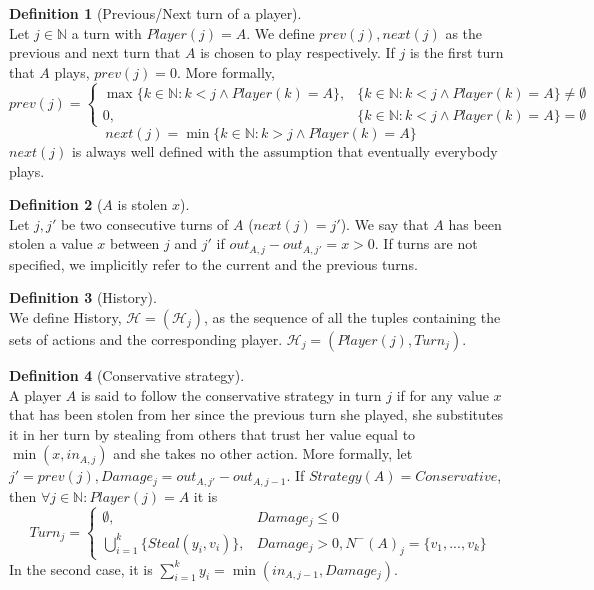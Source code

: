 \documentclass[11pt]{article}
\theoremstyle{definition}
\newtheorem{definition}{Definition}[section]
\theoremstyle{corollary}
\theoremstyle{lemma}
\begin{document}
     \begin{definition}[Previous/Next turn of a player] \ \\
        Let $j \in \mathbb{N}$ a turn with $Player(j) = A$. We define $prev(j), next(j)$ as the previous and next turn
        that $A$ is chosen to play respectively. If $j$ is the first turn that $A$ plays, $prev(j) = 0$. More formally,
        $$prev(j) = \begin{cases}
           \max{\{k \in \mathbb{N} : k < j \wedge Player(k) = A\}}, & \{k \in \mathbb{N} : k < j \wedge Player(k) = A\}
           \neq \emptyset \\
           0, & \{k \in \mathbb{N} : k < j \wedge Player(k) = A\} = \emptyset
        \end{cases}$$
        $$next(j) = \min{\{k \in \mathbb{N} : k > j \wedge Player(k) = A\}}$$
        $next(j)$ is always well defined with the assumption that eventually everybody plays.
     \end{definition}
     \begin{definition}[$A$ is stolen $x$] \ \\
        Let $j, j'$ be two consecutive turns of $A$ ($next(j) = j'$). We say that $A$ has been stolen a value $x$ between
        $j$ and $j'$ if $out_{A,j} - out_{A,j'} = x > 0$. If turns are not specified, we implicitly refer to the current
        and the previous turns.
     \end{definition}
     \begin{definition}[History] \ \\
        We define History, $\mathcal{H} = (\mathcal{H}_j)$, as the sequence of all the tuples containing the sets of actions
        and the corresponding player. $\mathcal{H}_j = (Player(j), Turn_j)$.
     \end{definition}
     \begin{definition}[Conservative strategy] \ \\
        A player $A$ is said to follow the conservative strategy in turn $j$ if for any value $x$ that has been stolen from
        her since the previous turn she played, she substitutes it in her turn by stealing from others that trust her value
        equal to $\min{(x,in_{A,j})}$ and she takes no other action.
        More formally, let $j' = prev(j), Damage_j = out_{A,j'} - out_{A,j-1}$. If $Strategy(A) = Conservative$, then
        $\forall j \in \mathbb{N}: Player(j) = A$ it is $$Turn_j =
        \begin{cases}
           \emptyset, & Damage_j \leq 0 \\
           \bigcup\limits_{i=1}^{k}\{Steal(y_i,v_i)\}, & Damage_j > 0, N^{-}(A)_j = \{v_1,...,v_k\}
        \end{cases}$$
        In the second case, it is $\sum\limits_{i=1}^{k}y_i = \min(in_{A,j-1}, Damage_j)$. \\
     \end{definition}
\end{document}
